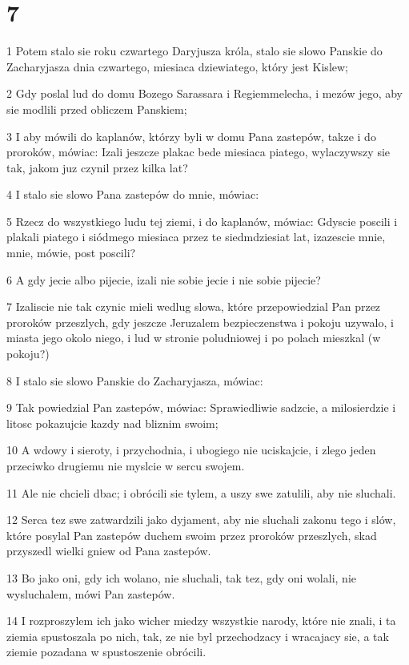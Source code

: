 \chapter{7}

\par 1 Potem stalo sie roku czwartego Daryjusza króla, stalo sie slowo Panskie do Zacharyjasza dnia czwartego, miesiaca dziewiatego, który jest Kislew;
\par 2 Gdy poslal lud do domu Bozego Sarassara i Regiemmelecha, i mezów jego, aby sie modlili przed obliczem Panskiem;
\par 3 I aby mówili do kaplanów, którzy byli w domu Pana zastepów, takze i do proroków, mówiac: Izali jeszcze plakac bede miesiaca piatego, wylaczywszy sie tak, jakom juz czynil przez kilka lat?
\par 4 I stalo sie slowo Pana zastepów do mnie, mówiac:
\par 5 Rzecz do wszystkiego ludu tej ziemi, i do kaplanów, mówiac: Gdyscie poscili i plakali piatego i siódmego miesiaca przez te siedmdziesiat lat, izazescie mnie, mnie, mówie, post poscili?
\par 6 A gdy jecie albo pijecie, izali nie sobie jecie i nie sobie pijecie?
\par 7 Izaliscie nie tak czynic mieli wedlug slowa, które przepowiedzial Pan przez proroków przeszlych, gdy jeszcze Jeruzalem bezpieczenstwa i pokoju uzywalo, i miasta jego okolo niego, i lud w stronie poludniowej i po polach mieszkal (w pokoju?)
\par 8 I stalo sie slowo Panskie do Zacharyjasza, mówiac:
\par 9 Tak powiedzial Pan zastepów, mówiac: Sprawiedliwie sadzcie, a milosierdzie i litosc pokazujcie kazdy nad bliznim swoim;
\par 10 A wdowy i sieroty, i przychodnia, i ubogiego nie uciskajcie, i zlego jeden przeciwko drugiemu nie myslcie w sercu swojem.
\par 11 Ale nie chcieli dbac; i obrócili sie tylem, a uszy swe zatulili, aby nie sluchali.
\par 12 Serca tez swe zatwardzili jako dyjament, aby nie sluchali zakonu tego i slów, które posylal Pan zastepów duchem swoim przez proroków przeszlych, skad przyszedl wielki gniew od Pana zastepów.
\par 13 Bo jako oni, gdy ich wolano, nie sluchali, tak tez, gdy oni wolali, nie wysluchalem, mówi Pan zastepów.
\par 14 I rozproszylem ich jako wicher miedzy wszystkie narody, które nie znali, i ta ziemia spustoszala po nich, tak, ze nie byl przechodzacy i wracajacy sie, a tak ziemie pozadana w spustoszenie obrócili.

